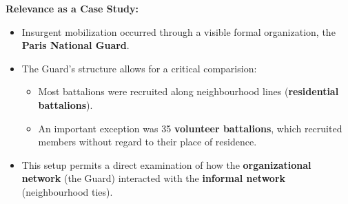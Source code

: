 \documentclass{article}
\begin{document}
    \noindent \textbf{Relevance as a Case Study:}
    \begin{itemize}
        \item Insurgent mobilization occurred through a visible formal
        organization, the \textbf{Paris National Guard}.
        \item The Guard's structure allows for a critical comparision:
        \begin{itemize}
            \item Most battalions were recruited along neighbourhood lines (\textbf{residential battalions}).
            \item An important exception was 35 \textbf{volunteer battalions}, which recruited members without regard to their place of residence.
        \end{itemize}
        \item This setup permits a direct examination of how the
        \textbf{organizational network} (the Guard) interacted with the \textbf{informal network} (neighbourhood ties).
    \end{itemize}

 
\end{document}
